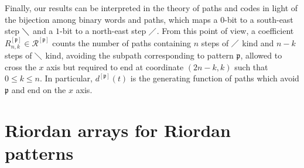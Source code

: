 Finally, our results can be interpreted in the theory of paths and codes in
light of the bijection among binary words and paths, which maps a $0$-bit to a
south-east step $\diagdown$ and a $1$-bit  to a north-east step $\diagup$. From
this point of view, a coefficient $R_{n,k}^{[\mathfrak{p}]} \in
\mathcal{R}^{[\mathfrak{p}]}$ counts the number of paths containing $n$ steps
of $\diagup$ kind and $n-k$ steps of $\diagdown$ kind, avoiding the subpath
corresponding to pattern $\mathfrak{p}$, allowed to cross the $x$ axis but
required to end at coordinate $(2n-k, k)$ such that $0 \leq k \leq n$.
In particular, $d^{[\mathfrak{p}]}(t)$ is the generating function of paths which avoid
 $\mathfrak{p}$ and end on the $x$ axis.


\section{Riordan arrays for Riordan patterns}


